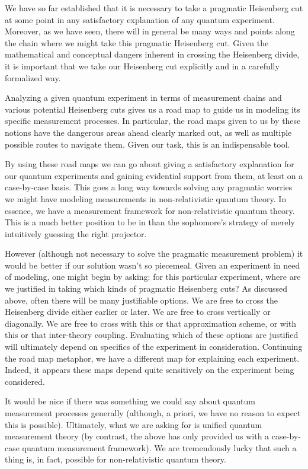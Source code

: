 \documentclass[prd,twocolumn,superscriptaddress,floatfix,amsmath,amssymb,amsfonts,nofootinbib]{revtex4-2}
\begin{document}
We have so far established that it is necessary to take a pragmatic Heisenberg cut at some point in any satisfactory explanation of any quantum experiment. Moreover, as we have seen, there will in general be many ways and points along the chain where we might take this pragmatic Heisenberg cut. Given the mathematical and conceptual dangers inherent in crossing the Heisenberg divide, it is important that we take our Heisenberg cut explicitly and in a carefully formalized way. 

Analyzing a given quantum experiment in terms of measurement chains and various potential Heisenberg cuts gives us a road map to guide us in modeling its specific measurement processes. In particular, the road maps given to us by these notions have the dangerous areas ahead clearly marked out, as well as multiple possible routes to navigate them. Given our task, this is an indispensable tool.

By using these road maps we can go about giving a satisfactory explanation for our quantum experiments and gaining evidential support from them, at least on a case-by-case basis. This goes a long way towards solving any pragmatic worries we might have modeling measurements in non-relativistic quantum theory. In essence, we have a measurement framework for non-relativistic quantum theory. This is a much better position to be in than the sophomore's strategy of merely intuitively guessing the right projector.

However (although not necessary to solve the pragmatic measurement problem) it would be better if our solution wasn't so piecemeal. Given an experiment in need of modeling, one might begin by asking: for this particular experiment, where are we justified in taking which kinds of pragmatic Heisenberg cuts? As discussed above, often there will be many justifiable options. We are free to cross the Heisenberg divide either earlier or later. We are free to cross vertically or diagonally. We are free to cross with this or that approximation scheme, or with this or that inter-theory coupling. Evaluating which of these options are justified will ultimately depend on specifics of the experiment in consideration. Continuing the road map metaphor, we have a different map for explaining each experiment. Indeed, it appears these maps depend quite sensitively on the experiment being considered.

It would be nice if there was something we could say about quantum measurement processes generally (although, a priori, we have no reason to expect this is possible). Ultimately, what we are asking for is unified quantum measurement theory (by contrast, the above has only provided us with a case-by-case quantum measurement framework). We are tremendously lucky that such a thing is, in fact, possible for non-relativistic quantum theory.
\end{document}
